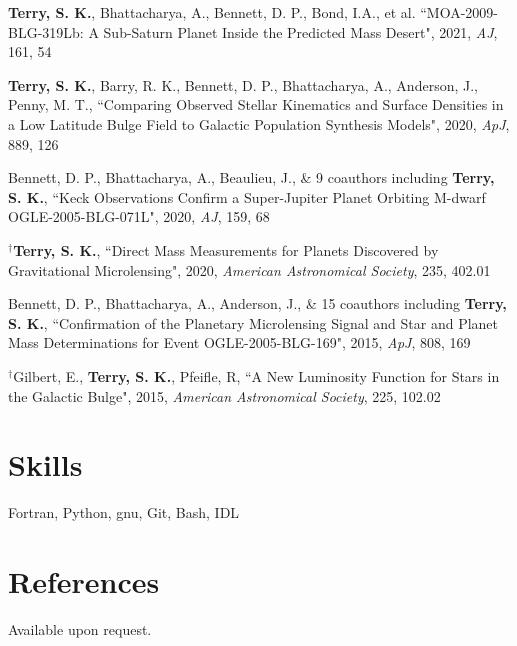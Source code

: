 \documentclass[margin,line]{res}
\begin{document}
\begin{resume}
\begin{etaremune}
\item \textbf{Terry, S. K.}, Bhattacharya, A., Bennett, D. P., Bond, I.A., et al. ``MOA-2009-BLG-319Lb: A Sub-Saturn Planet Inside the Predicted Mass Desert", 2021, \textit{AJ}, 161, 54

\item {\bf Terry, S. K.}, Barry, R. K., Bennett, D. P., Bhattacharya, A., Anderson, J., Penny, M. T., ``Comparing Observed Stellar Kinematics and Surface Densities in a Low Latitude Bulge Field to Galactic Population Synthesis Models", 2020, \textit{ApJ}, 889, 126

\item Bennett, D. P., Bhattacharya, A., Beaulieu, J., \& 9 coauthors including {\bf Terry, S. K.}, ``Keck Observations Confirm a Super-Jupiter Planet Orbiting M-dwarf OGLE-2005-BLG-071L", 2020, \textit{AJ}, 159, 68

\item $^{\dagger}${\bf Terry, S. K.}, ``Direct Mass Measurements for Planets Discovered by Gravitational Microlensing", 2020, \textit{American Astronomical Society}, 235, 402.01

\item Bennett, D. P., Bhattacharya, A., Anderson, J., \& 15 coauthors including {\bf Terry, S. K.}, ``Confirmation of the Planetary Microlensing Signal and Star and Planet Mass Determinations for Event OGLE-2005-BLG-169", 2015, \textit{ApJ}, 808, 169

\item $^{\dagger}$Gilbert, E., {\bf Terry, S. K.}, Pfeifle, R, ``A New Luminosity Function for Stars in the Galactic Bulge", 2015, \textit{American Astronomical Society}, 225, 102.02

\end{etaremune}

\section{\sc Skills}
Fortran, Python, gnu, Git, Bash, IDL


\section{\sc References }
Available upon request.

\end{resume}
\end{document}
